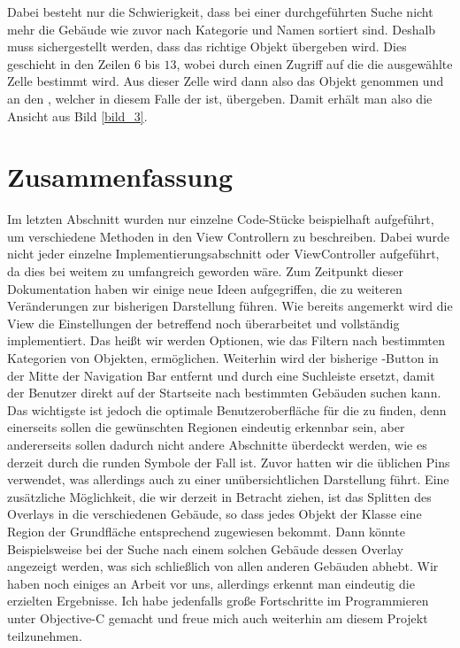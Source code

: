 \documentclass{report}
\begin{document}
Dabei besteht nur die Schwierigkeit, dass bei einer durchgeführten Suche nicht mehr die Gebäude wie zuvor nach Kategorie und Namen sortiert sind. Deshalb muss sichergestellt werden, dass das richtige Objekt übergeben wird. Dies geschieht in den Zeilen $6$ bis $13$, wobei durch einen Zugriff auf die  die ausgewählte Zelle bestimmt wird. Aus dieser Zelle wird dann also das Objekt genommen und an den , welcher in diesem Falle der  ist, übergeben. Damit erhält man also die Ansicht aus Bild \ref{bild_3}.

\newpage
\chapter{Zusammenfassung}

Im letzten Abschnitt wurden nur einzelne Code-Stücke beispielhaft aufgeführt, um verschiedene Methoden in den View Controllern zu beschreiben. Dabei wurde nicht jeder einzelne Implementierungsabschnitt oder ViewController aufgeführt, da dies bei weitem zu umfangreich geworden wäre. Zum Zeitpunkt dieser Dokumentation haben wir einige neue Ideen aufgegriffen, die zu weiteren Veränderungen zur bisherigen Darstellung führen. Wie bereits angemerkt wird die View die Einstellungen der  betreffend noch überarbeitet und vollständig implementiert. Das heißt wir werden Optionen, wie das Filtern nach bestimmten Kategorien von Objekten, ermöglichen. Weiterhin wird der bisherige -Button in der Mitte der Navigation Bar entfernt und durch eine Suchleiste ersetzt, damit der Benutzer direkt auf der Startseite nach bestimmten Gebäuden suchen kann. Das wichtigste ist jedoch die optimale Benutzeroberfläche für die  zu finden, denn einerseits sollen die gewünschten Regionen eindeutig erkennbar sein, aber andererseits sollen dadurch nicht andere Abschnitte überdeckt werden, wie es derzeit durch die runden Symbole der Fall ist. Zuvor hatten wir die üblichen Pins verwendet, was allerdings auch zu einer unübersichtlichen Darstellung führt. Eine zusätzliche Möglichkeit, die wir derzeit in Betracht ziehen, ist das Splitten des Overlays in die verschiedenen Gebäude, so dass jedes Objekt der Klasse  eine Region der Grundfläche entsprechend zugewiesen bekommt. Dann könnte Beispielsweise bei der Suche nach einem solchen Gebäude dessen Overlay angezeigt werden, was sich schließlich von allen anderen Gebäuden abhebt. Wir haben noch einiges an Arbeit vor uns, allerdings erkennt man eindeutig die erzielten Ergebnisse. Ich habe jedenfalls große Fortschritte im Programmieren unter Objective-C gemacht und freue mich auch weiterhin am diesem Projekt teilzunehmen.
\end{document}
